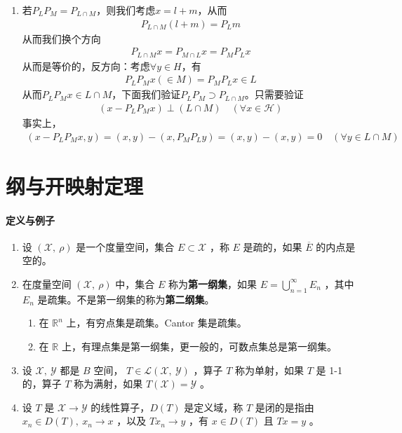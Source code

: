 \begin{enumerate}[leftmargin=2cm, label=\arabic*]
\begin{enumerate}[leftmargin=1cm, label=(\arabic*)]
			\item 若$P_LP_M = P_{L\cap M}$，则我们考虑$x = l + m$，从而
			\begin{align*}
				P_{L\cap M} (l + m) = P_L m
			\end{align*}
			从而我们换个方向
			\begin{align*}
				P_{L \cap M} x = P_{M\cap L} x = P_M P_L x
			\end{align*}
			从而是等价的，反方向：考虑$\forall y\in H$，有
			\begin{align*}
				P_L P_M x (\in M) = P_M P_L x \in L
			\end{align*}
			从而$P_L P_M x\in L\cap M$，下面我们验证$P_L P_M \supset P_{L\cap M}$。只需要验证
			\begin{align*}
				(x - P_LP_M x) \perp (L\cap M) \quad (\forall x\in \mathscr{H})
			\end{align*}
			事实上，
			\begin{align*}
				(x - P_LP_M x, y) = (x,y) - (x, P_MP_L y) = (x,y) - (x,y) = 0 \quad (\forall y\in L\cap M)
			\end{align*}
		\end{enumerate}
	\end{enumerate}
	
	
	\section{纲与开映射定理}
	\paragraph{定义与例子}
	\begin{enumerate}[leftmargin=2cm, label=\arabic*]
		\item 设 $(\mathscr{X},\ \rho)$ 是一个度量空间，集合 $E\subset \mathscr{X}$ ，称 $E$ 是疏的，如果 $\overline{E}$ 的内点是空的。
		\item 在度量空间 $(\mathscr{X},\ \rho)$ 中，集合 $E$ 称为\textbf{第一纲集}，如果 $E = \bigcup\limits_{n=1}^{\infty} E_n$ ，其中 $E_n$ 是疏集。不是第一纲集的称为\textbf{第二纲集}。
		\begin{enumerate}[leftmargin=1cm, label=(\arabic*)]
			\item 在 $\mathbb{R}^n$ 上，有穷点集是疏集。Cantor 集是疏集。
			\item 在 $\mathbb{R}$ 上，有理点集是第一纲集，更一般的，可数点集总是第一纲集。
		\end{enumerate}
		\item 设 $\mathscr{X},\ \mathscr{Y}$ 都是 $B$ 空间， $T\in\mathscr{L}(\mathscr{X},\ \mathscr{Y})$ ，算子 $T$ 称为单射，如果 $T$ 是 1-1 的，算子 $T$ 称为满射，如果 $T(\mathscr{X}) = \mathscr{Y}$ 。
		\item 设 $T$ 是 $\mathscr{X}\to\mathscr{Y}$ 的线性算子，$D(T)$ 是定义域，称 $T$ 是闭的是指由 $x_n\in D(T),\ x_n\to x$ ，以及 $Tx_n\to y$ ，有 $x\in D(T)$ 且 $Tx = y$ 。
	\end{enumerate}
	
